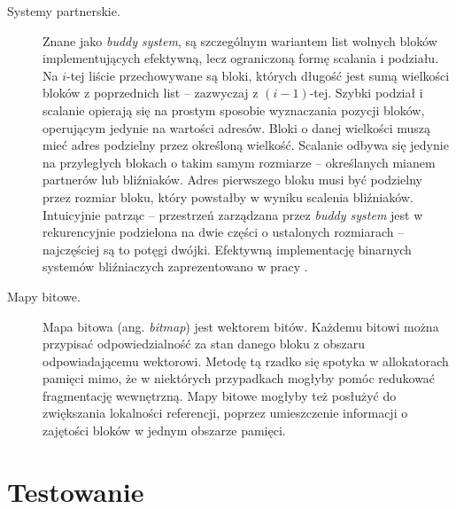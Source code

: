 \documentclass[12pt,a4paper,titlepage,twoside]{mwart}
\begin{document}
\begin{description}

\item[Systemy partnerskie.] Znane jako \textit{buddy system}, są szczególnym
wariantem list wolnych bloków implementujących efektywną, lecz ograniczoną
formę scalania i podziału. Na $i$-tej liście przechowywane są bloki, których
długość jest sumą wielkości bloków z poprzednich list -- zazwyczaj z
$(i-1)$-tej. Szybki podział i scalanie opierają się na prostym sposobie
wyznaczania pozycji bloków, operującym jedynie na wartości adresów.  Bloki o
danej wielkości muszą mieć adres podzielny przez określoną wielkość.  Scalanie
odbywa się jedynie na przyległych blokach o takim samym rozmiarze --
określanych mianem partnerów lub bliźniaków. Adres pierwszego bloku musi być
podzielny przez rozmiar bloku, który powstałby w wyniku scalenia bliźniaków.
Intuicyjnie patrząc -- przestrzeń zarządzana przez \textit{buddy system} jest w
rekurencyjnie podzielona na dwie części o ustalonych rozmiarach -- najczęściej
są to potęgi dwójki. Efektywną implementację binarnych systemów bliźniaczych
zaprezentowano w pracy \cite{demaine99fast}.

\vspace{1ex}

\item[Mapy bitowe.] Mapa bitowa (ang. \textit{bitmap}) jest wektorem bitów.
Każdemu bitowi można przypisać odpowiedzialność za stan danego bloku z obszaru
odpowiadającemu wektorowi. Metodę tą rzadko się spotyka w allokatorach pamięci
mimo, że w niektórych przypadkach mogłyby pomóc redukować fragmentację
wewnętrzną. Mapy bitowe mogłyby też posłużyć do zwiększania lokalności
referencji, poprzez umieszczenie informacji o zajętości bloków w jednym
obszarze pamięci.

\end{description}

\newpage


\section{Testowanie}
\hypertarget{Testowanie}{}
\end{document}
